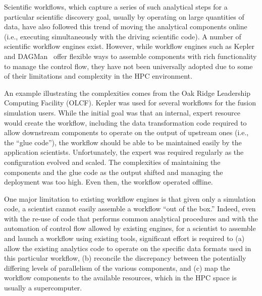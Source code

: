 Scientific workflows, which 
capture a series of such analytical steps for a
particular scientific discovery goal, usually
by operating on large quantities of data,
have also followed this trend of moving the analytical components
online (i.e., executing simultaneously with the driving scientific code).
A number of scientific workflow engines exist.
However, while workflow engines such as
Kepler~\cite{bertram:2006:kepler} and
DAGMan~\cite{Malewicz:2006:dagman}
offer flexible ways to assemble components
with rich functionality to manage the control flow, they have not been
universally adopted due to some of their limitations and complexity in the
HPC environment.

An example illustrating the complexities comes from the Oak Ridge
Leadership Computing Facility (OLCF).  Kepler was used for several workflows
for the fusion simulation users.  While the initial goal was that an internal,
expert resource would create the workflow,
including the data transformation code required
to allow downstream components to operate on the output of
upstream ones (i.e., the ``glue code''),
the workflow should be able to be maintained
easily by the application scientists. Unfortunately,
the expert was required regularly as the configuration evolved and scaled.
The complexities of maintaining the components and the glue code as the output
shifted and managing the deployment was too high.
Even then, the workflow operated offline.

One major limitation to existing workflow engines is that
given only a simulation code, a scientist cannot easily
assemble a workflow ``out of the box.''
Indeed, even with the re-use of code that performs
common analytical procedures and with the automation of control flow
allowed by existing engines,
for a scientist to assemble
and launch a workflow using existing tools,
significant effort is required to (a) allow the existing
analytics code
to operate on the specific data formats used in this
particular workflow,
(b) reconcile the discrepancy between the potentially
differing levels of parallelism
of the various components,
and (c) map the workflow components
to the available resources, which in the HPC space
is usually a supercomputer.



